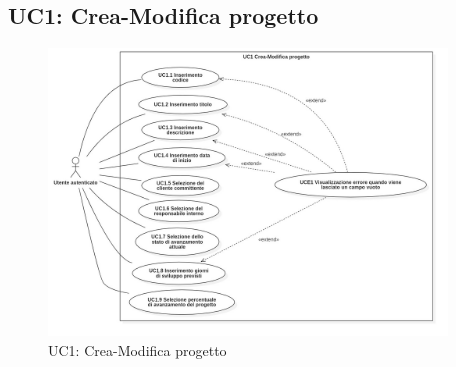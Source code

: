 \subsection{UC1: Crea-Modifica progetto}
\begin{figure}[!h]
\centering
\includegraphics[width=400px]{../images/UC/.jpeg/UC1-nuovoModificaProgetto.jpg}
\caption{UC1: Crea-Modifica progetto}
\end{figure}

